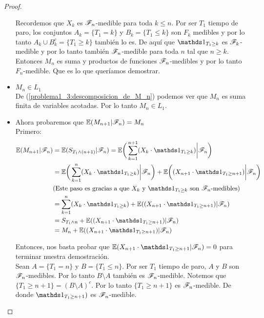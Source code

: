 \begin{proof}
\begin{itemize}
				Recordemos que $X_k$ es $\mathscr{F}_n$-medible para toda $k \leq n $. Por ser
				$T_1$ tiempo de paro, los conjuntos $A_k = \{T_1 = k\}$ y 
				$B_k = \{T_1 \leq k\}$	son $F_k$ medibles y por lo tanto 
				$A_k \cup B_k^c = \{ T_1 \geq k\}$ también lo es. De aquí que 
				$\indic_{T_1 \geq k}$ es $\mathscr{F}_k$-medible y por lo tanto también $\mathscr{F}_n$-medible
				para toda $n$ tal que $n \geq k$.\\
				  
				Entonces $M_n$ es suma y productos de funciones $\mathscr{F}_n$-medibles y por lo tanto
				$F_n$-medible. Que es lo que queríamos demostrar.\\
				
			\item
				$M_n \in L_1$\\
				
				De (\ref{problema1_3:descomposicion_de_M_n}) podemos ver que $M_n$ es 
				suma finita de variables acotadas. Por lo tanto $M_n \in L_1$.\\
				
			\item Ahora probaremos que	$\mathbb{E}(M_{n+1} | \mathscr{F}_{n}) = M_{n}$\\
				
				Primero:
				\begin{align}
					\E(M_{n+1} | \F_{n}) &= \E( S_{T_1 \wedge (n+1)} | \F_{n}) = 
					\E\bigg( \sum_{k=1}^{n+1} (X_k \cdot \indic_{T_1 \geq k})\bigg| \F_{n}\bigg) \\	 			
					& =\E\bigg( \sum_{k=1}^{n} (X_k \cdot \indic_{T_1 \geq k}) \bigg| \F_{n}\bigg) +
					\E\bigg((X_{n+1} \cdot \indic_{T_1 \geq n+1}) \bigg| \F_{n}\bigg) \\
					&\mbox{(Este paso es gracias a que $X_k$ y $\indic_{T_1 \geq k}$ son $\F_n$-medibles)}\\
					& = \sum_{k=1}^{n} (X_k \cdot \indic_{T_1 \geq k}) + 
					\E((X_{n+1} \cdot \indic_{T_1 \geq n+1}) | \F_{n}) \\
					& = S_{T_1 \wedge n} + \E((X_{n+1} \cdot \indic_{T_1 \geq n+1}) | \F_{n}) \\
					& = M_n + \E((X_{n+1} \cdot \indic_{T_1 \geq n+1}) | \F_{n})
				\end{align}
				
				Entonces, nos basta probar que $\E(X_{n+1} \cdot \indic_{T_1 \geq n+1} |
				 \F_{n}) = 0$ para terminar nuestra demostración.\\
				 
				Sean $A = \{T_1 = n\}$ y $B = \{ T_1 \leq n\}$. Por ser $T_1$ tiempo de paro,
				$A$ y $B$ son $\mathscr{F}_n$-medibles. Por lo tanto $B \setminus A$ también es $\mathscr{F}_n$-medible. 
				Notemos que $\{T_1 \geq n+1\} = (B \setminus A)^c$. Por lo tanto $\{T_1 \geq n+1\}$ es
				$\mathscr{F}_n$-medible. De donde  $\indic_{T_1 \geq n+1})$ es $\mathscr{F}_n$-medible.\\
				

\end{itemize}
\end{proof}
